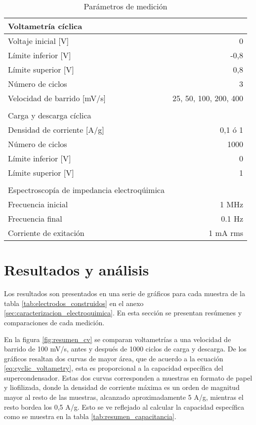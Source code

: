 \begin{table}[h!]
	\centering
	\caption{Parámetros de medición}
	\begin{tabular}{ l r }
		Voltametría cíclica &  \\
		\hline
		Voltaje inicial [V] & 0 \\
		Límite inferior [V] & -0,8 \\
		Límite superior [V] & 0,8  \\
		Número de ciclos & 3 \\
		Velocidad de barrido [mV/s] & 25, 50, 100, 200, 400 \\
		& \\
		Carga y descarga cíclica & \\
		\hline
		Densidad de corriente [A/g] & 0,1 ó 	1 \\
		Número de ciclos & 1000 \\
		Límite inferior [V] & 0 \\
		Límite superior [V] & 1 \\
		& \\
		Espectroscopía de impedancia electroqúimica & \\
		\hline
		Frecuencia inicial	&	1 MHz \\
		Frecuencia final	&	0.1 Hz \\
		Corriente de exitación & 1 mA rms \\ 
	\end{tabular}
	\label{tab:elec_config}
\end{table}

\section{Resultados y análisis}

Los resultados son presentados en una serie de gráficos para cada muestra de la tabla \ref{tab:electrodos_construidos} en el anexo \ref{sec:caracterizacion_electroquimica}. En esta sección se presentan resúmenes y comparaciones de cada medición.

En la figura \ref{fig:resumen_cv} se comparan voltametrías a una velocidad de barrido de 100 mV/s, antes y después de 1000 ciclos de carga y descarga. De los gráficos resaltan dos curvas de mayor área, que de acuerdo a la ecuación \ref{eq:cyclic_voltametry}, esta es proporcional a la capacidad específica del supercondensador. Estas dos curvas corresponden a muestras en formato de papel y liofilizada, donde la densidad de corriente máxima es un orden de magnitud mayor al resto de las muestras, alcanzado aproximadamente 5 A/g, mientras el resto bordea los 0,5 A/g. Esto se ve reflejado al calcular la capacidad específica como se muestra en la tabla \ref{tab:resumen_capacitancia}.

